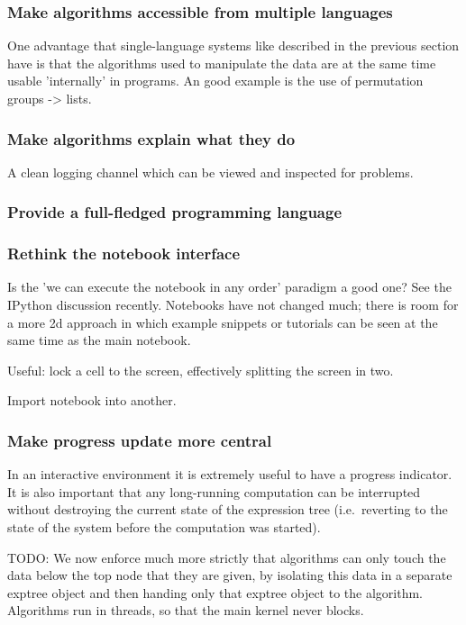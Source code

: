 \documentclass[11pt]{article}
\begin{document}
\subsubsection{Make algorithms accessible from multiple languages}

One advantage that single-language systems like described in the
previous section have is that the algorithms used to manipulate the
data are at the same time usable 'internally' in programs. An good
example is the use of permutation groups -> lists.

\subsubsection{Make algorithms explain what they do}

A clean logging channel which can be viewed and inspected for problems.


\subsubsection{Provide a full-fledged programming language}



\subsubsection{Rethink the notebook interface}

Is the 'we can execute the notebook in any order' paradigm a good one?
See the IPython discussion recently. Notebooks have not changed much;
there is room for a more 2d approach in which example snippets or
tutorials can be seen at the same time as the main notebook.

Useful: lock a cell to the screen, effectively splitting the screen in
two. 

Import notebook into another. 

\subsubsection{Make progress update more central}

In an interactive environment it is extremely useful to have a
progress indicator. It is also important that any long-running
computation can be interrupted without destroying the current state of
the expression tree (i.e.~reverting to the state of the system before
the computation was started). 

TODO: We now enforce much more strictly that algorithms can only touch the
data below the top node that they are given, by isolating this data in
a separate exptree object and then handing only that exptree object to
the algorithm. Algorithms run in threads, so that the main kernel
never blocks.
\end{document}

